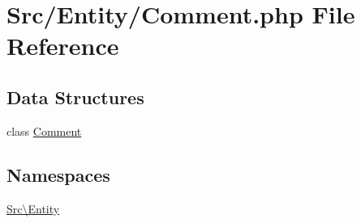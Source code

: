 \hypertarget{_comment_8php}{}\section{Src/\+Entity/\+Comment.php File Reference}
\label{_comment_8php}
\subsection*{Data Structures}
\begin{DoxyCompactItemize}
\item 
class \hyperlink{class_src_1_1_entity_1_1_comment}{Comment}
\end{DoxyCompactItemize}
\subsection*{Namespaces}
\begin{DoxyCompactItemize}
\item 
 \hyperlink{namespace_src_1_1_entity}{Src\textbackslash{}\+Entity}
\end{DoxyCompactItemize}
